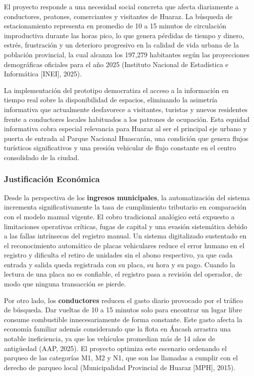 \documentclass[12pt,a4paper]{article}
\begin{document}
El proyecto responde a una necesidad social concreta que afecta diariamente a conductores, peatones, comerciantes y visitantes de Huaraz. La búsqueda de estacionamiento representa en promedio de 10 a 15 minutos de circulación improductiva durante las horas pico, lo que genera pérdidas de tiempo y dinero, estrés, frustración y un deterioro progresivo en la calidad de vida urbana de la población provincial, la cual alcanza los 197,279 habitantes según las proyecciones demográficas oficiales para el año 2025 (Instituto Nacional de Estadística e Informática [INEI], 2025).

La implementación del prototipo democratiza el acceso a la información en tiempo real sobre la disponibilidad de espacios, eliminando la asimetría informativa que actualmente desfavorece a visitantes, turistas y nuevos residentes frente a conductores locales habituados a los patrones de ocupación. Esta equidad informativa cobra especial relevancia para Huaraz al ser el principal eje urbano y puerta de entrada al Parque Nacional Huascarán, una condición que genera flujos turísticos significativos y una presión vehicular de flujo constante en el centro consolidado de la ciudad.


\subsubsection{Justificación Económica}

Desde la perspectiva de los \textbf{ingresos municipales}, la automatización del sistema incrementa significativamente la tasa de cumplimiento tributario en comparación con el modelo manual vigente. El cobro tradicional analógico está expuesto a limitaciones operativas críticas, fugas de capital y una evasión sistemática debido a las fallas intrínsecas del registro manual. Un sistema digitalizado sustentado en el reconocimiento automático de placas vehiculares reduce el error humano en el registro y dificulta el retiro de unidades sin el abono respectivo, ya que cada entrada y salida queda registrada con su placa, su hora y su pago. Cuando la lectura de una placa no es confiable, el registro pasa a revisión del operador, de modo que ninguna transacción se pierde.

Por otro lado, los \textbf{conductores} reducen el gasto diario provocado por el tráfico de búsqueda. Dar vueltas de 10 a 15 minutos solo para encontrar un lugar libre consume combustible innecesariamente de forma constante. Este gasto afecta la economía familiar además considerando que la flota en Áncash arrastra una notable ineficiencia, ya que los vehículos promedian más de 14 años de antigüedad (AAP, 2025). El proyecto optimiza este escenario ordenando el parqueo de las categorías M1, M2 y N1, que son las llamadas a cumplir con el derecho de parqueo local (Municipalidad Provincial de Huaraz [MPH], 2015).
\end{document}
